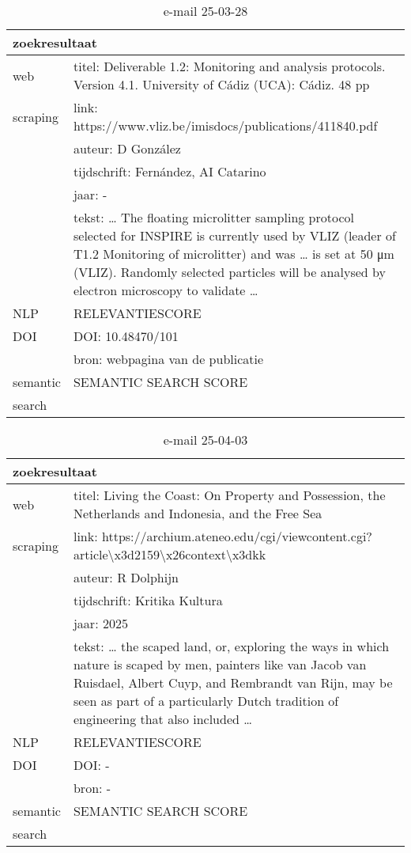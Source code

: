 \begin{table}[h!]
    \caption{e-mail 25-03-28}
    \centering
    \begin{tabularx}{\textwidth}{|p{4cm}|X|} 
        \hline
        \multicolumn{2}{|X|}{\textbf{zoekresultaat}} \\
        \hline
        web &titel: Deliverable 1.2: Monitoring and analysis protocols. Version 4.1. University of Cádiz (UCA): Cádiz. 48 pp\\
        scraping&link: https://www.vliz.be/imisdocs/publications/411840.pdf\\
        &auteur: D González\\
        &tijdschrift: Fernández, AI Catarino\\
        &jaar: -\\
        &tekst: … The floating microlitter sampling protocol selected for INSPIRE is currently used by VLIZ (leader of T1.2 Monitoring of microlitter) and was … is set at 50 μm (VLIZ). Randomly selected particles will be analysed by electron microscopy to validate …\\
        \hline
        NLP&RELEVANTIESCORE\\
        \hline
        DOI&DOI: 10.48470/101\\
        &bron: webpagina van de publicatie\\
        \hline
        semantic&SEMANTIC SEARCH SCORE\\
        search&\\
        \hline
    \end{tabularx}
    \label{table:email20250328}
\end{table}
\begin{table}[h!]
    \caption{e-mail 25-04-03}
    \centering
    \begin{tabularx}{\textwidth}{|p{4cm}|X|} 
        \hline
        \multicolumn{2}{|X|}{\textbf{zoekresultaat}} \\
        \hline
        web &titel: Living the Coast: On Property and Possession, the Netherlands and Indonesia, and the Free Sea\\
        scraping&link: https://archium.ateneo.edu/cgi/viewcontent.cgi?article\textbackslash x3d2159\textbackslash x26context\textbackslash x3dkk\\
        &auteur: R Dolphijn\\
        &tijdschrift: Kritika Kultura\\
        &jaar: 2025\\
        &tekst: … the scaped land, or, exploring the ways in which nature is scaped by men, painters like van Jacob van Ruisdael, Albert Cuyp, and Rembrandt van Rijn, may be seen as part of a particularly Dutch tradition of engineering that also included …\\
        \hline
        NLP&RELEVANTIESCORE\\
        \hline
        DOI&DOI: -\\
        &bron: -\\
        \hline
        semantic&SEMANTIC SEARCH SCORE\\
        search&\\
        \hline
    \end{tabularx}
    \label{table:email20250403}
\end{table}
